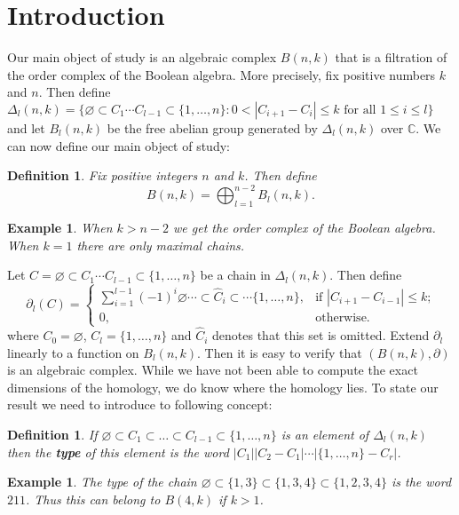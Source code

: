 \documentclass{article}
\newtheorem{definition}[theorem]{Definition}
\newtheorem{example}[theorem]{Example}
\newcommand{\C}{\mathbb{C}}
\begin{document}
\section{Introduction}\label{S:intro}

  Our main object of study is an algebraic complex $B(n, k)$ that is a filtration of the order complex of the 
Boolean algebra. More precisely, fix positive numbers $k$ and $n$. Then define 
  $\Delta_l(n, k) = \{\varnothing \subset C_1 \cdots C_{l-1} \subset \{1, \ldots, n\}
  \colon 0 < |C_{i+1} - C_i| \le k 
  \mbox{ for all } 1 \le i \le l \}$ and let $B_l(n, k)$ be the free abelian group generated by $\Delta_l(n, k)$ over $\C$.
We can now define our main object of study: 
\begin{definition}\label{:B(n,k)} Fix positive integers $n$ and $k$. Then define
$$B(n, k) = \bigoplus_{l=1}^{n-2} B_l(n, k).$$
\end{definition}
\begin{example} When $k > n-2$ we get the order complex of the Boolean algebra. When $k=1$ there are only maximal chains.
\end{example}
Let $C = \varnothing \subset C_1  \cdots C_{l-1} \subset \{1, \ldots, n\}$ be a chain in $\Delta_l(n, k)$.
Then define
\begin{equation}\label{E:delta}
  \partial_l(C) = 
  \begin{cases}
     \sum_{i=1}^{l-1} (-1)^i \varnothing \cdots \subset {\hat C_i} \subset \cdots  \{1, \ldots, n\}, 
	 &\text{if $|C_{i+1} - C_{i-1}| \le k$;}\\
     0, &\text{otherwise.}
  \end{cases}
\end{equation} where $C_0 = \varnothing$, $C_l = \{1, \ldots, n\}$ and ${\hat C_i}$ denotes that this set is omitted. 
Extend $\partial_l$ linearly to a function on $B_l(n, k)$. Then it is easy to verify that $(B(n, k), \partial)$
is an algebraic complex.  While we have not been able to compute the 
exact dimensions of the homology, we do know where the homology lies. To state our result we need to introduce to following
concept:
\begin{definition}\label{D:type}
If $\varnothing \subset C_1 \subset \ldots \subset C_{l-1} \subset \{1, \ldots, n\}$ is
           an element of $\Delta_l(n, k)$ then the {\bf type} of this element is the word 
           $|C_1||C_2 - C_1|\cdots|\{1, \ldots, n\} - C_r|$.
\end{definition}
\begin{example} The type of the chain $\varnothing \subset \{1, 3\} \subset \{1, 3, 4\} \subset \{1, 2,3, 4\}$ is the word
$211$. Thus this can belong to $B(4, k)$ if $k >1$.
\end{example}
\end{document}
